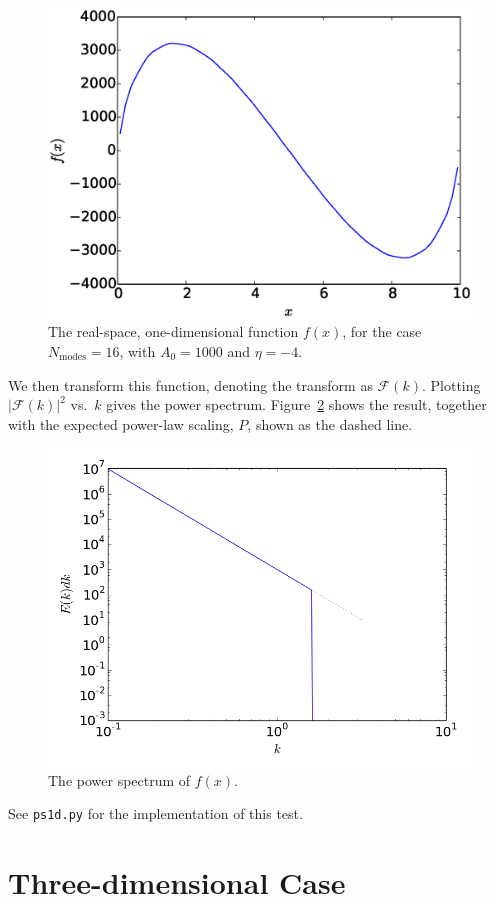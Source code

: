 \documentclass[11pt]{article}
\begin{document}
\begin{figure}[t]
\centering
\includegraphics[width=0.5\linewidth]{phi_1d}
\begin{minipage}[b]{0.45\linewidth}
\caption{\label{fig:phi1d} The real-space, one-dimensional function $f(x)$,
for the case $N_\mathrm{modes} = 16$, with $A_0 = 1000$ and $\eta = -4$.}
\end{minipage}
\end{figure}

We then transform this function, denoting the transform as $\mathcal{F}(k)$.  Plotting
$|\mathcal{F}(k)|^2$ vs.\ $k$ gives the power spectrum.  Figure~\ref{fig:ps1d} shows
the result, together with the expected power-law scaling, $P$, shown as the 
dashed line.

\begin{figure}[t]
\centering
\includegraphics[width=0.5\linewidth]{ps1d}
\begin{minipage}[b]{0.45\linewidth}
\caption{\label{fig:ps1d} The power spectrum of $f(x)$.}
\end{minipage}
\end{figure}



See {\tt ps1d.py} for the implementation of this test.



\section*{Three-dimensional Case}
\end{document}
